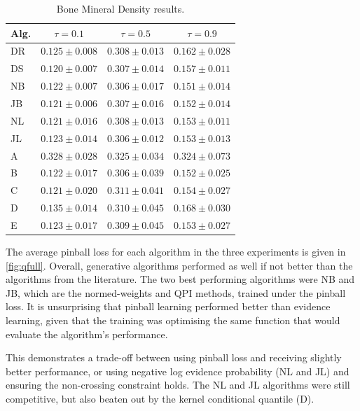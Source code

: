 \documentclass[twoside]{article} \usepackage{aistats2017}
\theoremstyle{definition}
\newcommand{\qpi}{QPI }
\begin{document}
		
		\begin{table}
			\begin{center}
				\begin{tabular}{l|ccc}
					Alg. & $\tau = 0.1$     & $\tau = 0.5$  & $\tau = 0.9$      \\ \hline
					DR & $0.125 \pm 0.008$ & $0.308 \pm 0.013$ & $0.162 \pm 0.028$ \\
					DS & $\mathbf{0.120 \pm 0.007}$ & $0.307 \pm 0.014$ & $0.157 \pm 0.011$ \\
					NB & $0.122 \pm 0.007$ & $\mathbf{0.306 \pm 0.017}$ & $\mathbf{0.151 \pm
						0.014}$ \\
					JB & $0.121 \pm 0.006$ & $0.307 \pm 0.016$ & $0.152 \pm 0.014$ \\
					NL & $0.121 \pm 0.016$ & $0.308 \pm 0.013$ & $0.153 \pm 0.011$ \\
					JL & $0.123 \pm 0.014$ & $\mathbf{0.306 \pm 0.012}$ & $0.153 \pm 0.013$ \\
					A & $0.328 \pm 0.028$ & $0.325 \pm 0.034$ & $0.324 \pm 0.073$ \\
					B & $0.122 \pm 0.017$ & $\mathbf{0.306 \pm 0.039}$ & $0.152 \pm 0.025$ \\
					C & $0.121 \pm 0.020$ & $0.311 \pm 0.041$ & $0.154 \pm 0.027$ \\
					D & $0.135 \pm 0.014$ & $0.310 \pm 0.045$ & $0.168 \pm 0.030$ \\
					E & $0.123 \pm 0.017$ & $0.309 \pm 0.045$ & $0.153 \pm 0.027$
				\end{tabular}
			\end{center}
			\caption{Bone Mineral Density results.}
			\label{table:bmd}
		\end{table}
		
		The average pinball loss for each algorithm in the three experiments is given in \cref{fig:qfull}. Overall, generative algorithms performed as well if not better than the algorithms from the literature. The two best performing algorithms were NB and JB, which are the normed-weights and \qpi methods, trained under the pinball loss. It is unsurprising that pinball learning performed better than evidence learning, given that the training was optimising the same function that would evaluate the algorithm's performance.

		This demonstrates a trade-off between using pinball loss and receiving slightly better performance, or using negative log evidence probability (NL and JL) and ensuring the non-crossing constraint holds. The NL and JL algorithms were still competitive, but also beaten out by the kernel conditional quantile (D).
\end{document}
